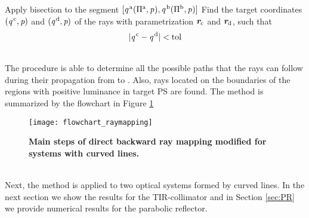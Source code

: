 \begin{algorithm}
\begin{algorithmic}[1]
\EndIf
\Else 
\State Apply bisection to the segment $[\textit{q}^{\,\textrm{a}}(\Pi^\textrm{a}, \textit{p}_{\textrm{} \textit{}}), \textit{q}^{\,\textrm{b}}(\Pi^\textrm{b}, \textit{p}_{\textrm{} \textit{}})]$
\State Find the target coordinates $(\textit{q}^{\,\textrm{c}},\textit{p})$ and $(\textit{q}^{\,\textrm{d}},\textit{p})$ of the rays with parame\-trization $\textit{\textbf{r}}_{\textrm{c}}$ and $\textit{\textbf{r}}_{\textrm{d}}$, such that $$|\textit{q}^{\,\textrm{c}}-\textit{q}^{\,\textrm{d}}|<\textrm{tol}$$
\If {$\lineaj\neq \nline$}
\State{}
\EndIf 
\State{}
\EndIf
\EndProcedure
\end{algorithmic}
\end{algorithm}
\\ \indent The procedure is able to determine all the possible paths that the rays can follow during their propagation from  to . Also, rays located on the boundaries of the regions with positive luminance in target PS  are found.
The method is summarized by the flowchart in Figure \ref{fig:flowchart_raymapping}
\begin{figure}[t]
  \begin{center}
  \texttt{[image: flowchart\_raymapping]}
  \end{center}
  \caption{\textbf{Main steps of direct backward ray mapping modified for systems with curved lines.}}
\label{fig:flowchart_raymapping}
 \end{figure}
\\ \indent
Next, the method is applied to two optical systems formed by curved lines. In the next section we show the results for the TIR-collimator and in Section \ref{sec:PR} we provide numerical results for the parabolic reflector.
